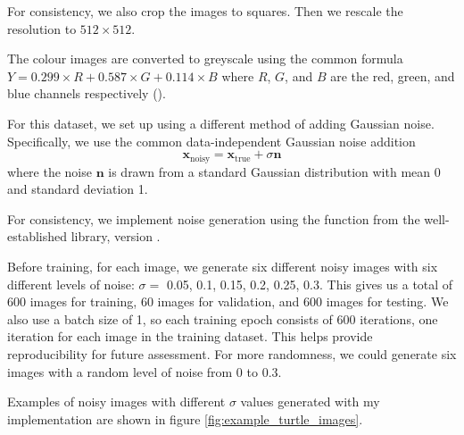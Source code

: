 \documentclass[12pt]{article}
\begin{document}
For consistency, we also crop the images to squares. Then we rescale the resolution to $512 \times 512$.

The colour images are converted to greyscale using the common formula $Y = 0.299 \times R + 0.587 \times G + 0.114 \times B$ where $R$, $G$, and $B$ are the red, green, and blue channels respectively (\cite{RGB-to-greyscale-formula-ITU-R_BT601}).

For this dataset, we set up using a different method of adding Gaussian noise. Specifically, we use the common data-independent Gaussian noise addition
\begin{equation}
    \mathbf{x}_{\text{noisy}} = \mathbf{x}_{\text{true}} + \sigma \mathbf{n}
\end{equation}
where the noise $\mathbf{n}$ is drawn from a standard Gaussian distribution with mean 0 and standard deviation 1.

For consistency, we implement noise generation using the
 function from the well-established  library, version .

Before training, for each image, we generate six different noisy images with six different levels of noise: $\sigma =$ 0.05, 0.1, 0.15, 0.2, 0.25, 0.3.
This gives us a total of 600 images for training, 60 images for validation, and 600 images for testing.
We also use a batch size of 1, so each training epoch consists of 600 iterations, one iteration for each image in the training dataset.
This helps provide reproducibility for future assessment.
For more randomness, we could generate six images with a random level of noise from 0 to 0.3.


Examples of noisy images with different $\sigma$ values generated with my implementation 
are shown in figure \ref{fig:example_turtle_images}.
\end{document}
